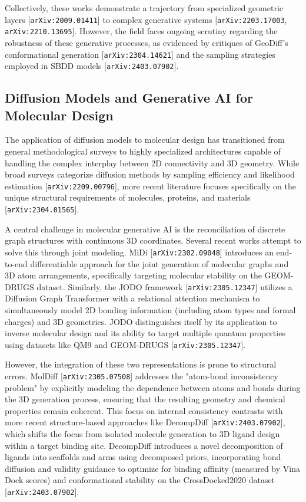 \documentclass[11pt]{article}
\begin{document}
Collectively, these works demonstrate a trajectory from specialized geometric layers [\texttt{arXiv:2009.01411}] to complex generative systems [\texttt{arXiv:2203.17003}, \texttt{arXiv:2210.13695}]. However, the field faces ongoing scrutiny regarding the robustness of these generative processes, as evidenced by critiques of GeoDiff's conformational generation [\texttt{arXiv:2304.14621}] and the sampling strategies employed in SBDD models [\texttt{arXiv:2403.07902}].

\subsection{Diffusion Models and Generative AI for Molecular Design}

The application of diffusion models to molecular design has transitioned from general methodological surveys to highly specialized architectures capable of handling the complex interplay between 2D connectivity and 3D geometry. While broad surveys categorize diffusion methods by sampling efficiency and likelihood estimation [\texttt{arXiv:2209.00796}], more recent literature focuses specifically on the unique structural requirements of molecules, proteins, and materials [\texttt{arXiv:2304.01565}].

A central challenge in molecular generative AI is the reconciliation of discrete graph structures with continuous 3D coordinates. Several recent works attempt to solve this through joint modeling. MiDi [\texttt{arXiv:2302.09048}] introduces an end-to-end differentiable approach for the joint generation of molecular graphs and 3D atom arrangements, specifically targeting molecular stability on the GEOM-DRUGS dataset. Similarly, the JODO framework [\texttt{arXiv:2305.12347}] utilizes a Diffusion Graph Transformer with a relational attention mechanism to simultaneously model 2D bonding information (including atom types and formal charges) and 3D geometries. JODO distinguishes itself by its application to inverse molecular design and its ability to target multiple quantum properties using datasets like QM9 and GEOM-DRUGS [\texttt{arXiv:2305.12347}].

However, the integration of these two representations is prone to structural errors. MolDiff [\texttt{arXiv:2305.07508}] addresses the "atom-bond inconsistency problem" by explicitly modeling the dependence between atoms and bonds during the 3D generation process, ensuring that the resulting geometry and chemical properties remain coherent. This focus on internal consistency contrasts with more recent structure-based approaches like DecompDiff [\texttt{arXiv:2403.07902}], which shifts the focus from isolated molecule generation to 3D ligand design within a target binding site. DecompDiff introduces a novel decomposition of ligands into scaffolds and arms using decomposed priors, incorporating bond diffusion and validity guidance to optimize for binding affinity (measured by Vina Dock scores) and conformational stability on the CrossDocked2020 dataset [\texttt{arXiv:2403.07902}].
\end{document}
